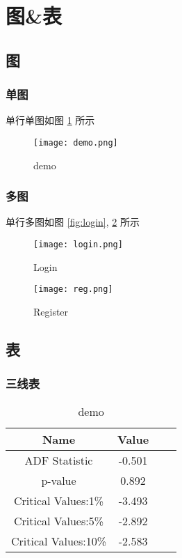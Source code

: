 \section{图\&表}

\subsection{图}

\subsubsection{单图}

单行单图如图 \ref{fig:demo} 所示

\begin{figure}[htbp]
    \centering
    \texttt{[image: demo.png]}
    \caption{demo}
    \label{fig:demo}
\end{figure}

\subsubsection{多图}

单行多图如图 \ref{fig:login}, \ref{fig:reg} 所示

\begin{figure}[H]
    \begin{minipage}[t]{0.49\linewidth}
        \centering
        \texttt{[image: login.png]}
        \caption{Login}\label{fig:login}
    \end{minipage}
    \begin{minipage}[t]{0.49\linewidth}
        \centering
        \texttt{[image: reg.png]}
        \caption{Register}\label{fig:reg}
    \end{minipage}
\end{figure}

\newpage

\subsection{表}
\subsubsection{三线表}

\begin{table}[h]
    \caption{demo}
    \label{tab:1}
    \xiaowu
    \centering
    \begin{tabular}{c c c c}
        \hline
        \textbf{Name}        & \textbf{Value} \\
        \hline

        ADF Statistic        & -0.501         \\
        p-value              & 0.892          \\
        Critical Values:1\%  & -3.493         \\
        Critical Values:5\%  & -2.892         \\
        Critical Values:10\% & -2.583         \\
        \hline
    \end{tabular}
\end{table}
